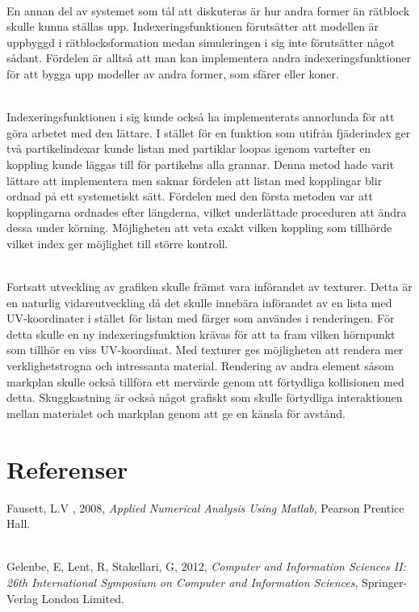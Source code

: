\documentclass[a4paper,12pt,oneside,final,swedish]{extarticle}
\begin{document}
\noindent\\En annan del av systemet som tål att diskuteras är hur andra former än rätblock skulle kunna ställas upp. Indexeringsfunktionen förutsätter att modellen är uppbyggd i rätblocksformation medan simuleringen i sig inte förutsätter något sådant. Fördelen är alltså att man kan implementera andra indexeringsfunktioner för att bygga upp modeller av andra former, som sfärer eller koner.

\noindent\\Indexeringsfunktionen i sig kunde också ha implementerats annorlunda för att göra arbetet med den lättare. I stället för en funktion som utifrån fjäderindex ger två partikelindexar kunde listan med partiklar loopas igenom vartefter en koppling kunde läggas till för partikelns alla grannar. Denna metod hade varit lättare att implementera men saknar fördelen att listan med kopplingar blir ordnad på ett systemetiskt sätt. Fördelen med den första metoden var att kopplingarna ordnades efter längderna, vilket underlättade proceduren att ändra dessa under körning. Möjligheten att veta exakt vilken koppling som tillhörde vilket index ger möjlighet till större kontroll.

\noindent\\Fortsatt utveckling av grafiken skulle främst vara införandet av texturer. Detta är en naturlig vidareutveckling då det skulle innebära införandet av en lista med UV-koordinater i stället för listan med färger som användes i renderingen. För detta skulle en ny indexeringsfunktion krävas för att ta fram vilken hörnpunkt som tillhör en viss UV-koordinat. Med texturer ges möjligheten att rendera mer verklighetstrogna och intressanta material. Rendering av andra element såsom markplan skulle också tillföra ett mervärde genom att förtydliga kollisionen med detta. Skuggkastning är också något grafiskt som skulle förtydliga interaktionen mellan materialet och markplan genom att ge en känsla för avstånd.


\section{Referenser}
Fausett, L.V , 2008, \textit{Applied Numerical Analysis Using Matlab}, Pearson Prentice Hall.

\noindent \\Gelenbe, E, Lent, R, Stakellari, G, 2012, \textit{Computer and Information Sciences II: 26th International Symposium on Computer and Information Sciences}, Springer-Verlag London Limited.
\end{document}
